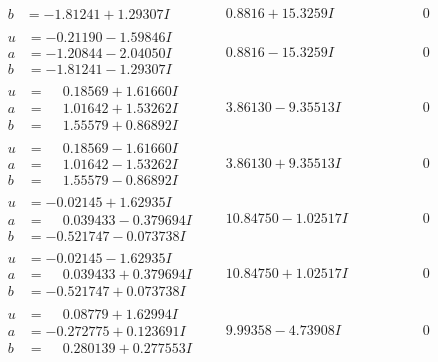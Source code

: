 \documentclass[1p]{elsarticle_modified}
\theoremstyle{definition}
\begin{document}
$$\begin{array}{c|c|c}
\begin{aligned}
b &= -1.81241 + 1.29307 I\end{aligned}
 & \phantom{-}0.8816 + 15.3259 I & \phantom{-0.000000 } 0 \\ \hline\begin{aligned}
u &= -0.21190 - 1.59846 I \\
a &= -1.20844 - 2.04050 I \\
b &= -1.81241 - 1.29307 I\end{aligned}
 & \phantom{-}0.8816 - 15.3259 I & \phantom{-0.000000 } 0 \\ \hline\begin{aligned}
u &= \phantom{-}0.18569 + 1.61660 I \\
a &= \phantom{-}1.01642 + 1.53262 I \\
b &= \phantom{-}1.55579 + 0.86892 I\end{aligned}
 & \phantom{-}3.86130 - 9.35513 I & \phantom{-0.000000 } 0 \\ \hline\begin{aligned}
u &= \phantom{-}0.18569 - 1.61660 I \\
a &= \phantom{-}1.01642 - 1.53262 I \\
b &= \phantom{-}1.55579 - 0.86892 I\end{aligned}
 & \phantom{-}3.86130 + 9.35513 I & \phantom{-0.000000 } 0 \\ \hline\begin{aligned}
u &= -0.02145 + 1.62935 I \\
a &= \phantom{-}0.039433 - 0.379694 I \\
b &= -0.521747 - 0.073738 I\end{aligned}
 & \phantom{-}10.84750 - 1.02517 I & \phantom{-0.000000 } 0 \\ \hline\begin{aligned}
u &= -0.02145 - 1.62935 I \\
a &= \phantom{-}0.039433 + 0.379694 I \\
b &= -0.521747 + 0.073738 I\end{aligned}
 & \phantom{-}10.84750 + 1.02517 I & \phantom{-0.000000 } 0 \\ \hline\begin{aligned}
u &= \phantom{-}0.08779 + 1.62994 I \\
a &= -0.272775 + 0.123691 I \\
b &= \phantom{-}0.280139 + 0.277553 I\end{aligned}
 & \phantom{-}9.99358 - 4.73908 I & \phantom{-0.000000 } 0 \\ \hline\begin{aligned}

\end{aligned}
\end{array}$$
\end{document}
